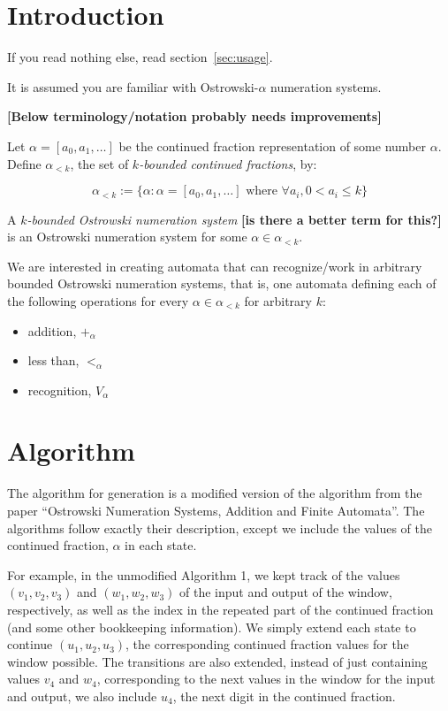 \documentclass{article}
\theoremstyle{definition}
\theoremstyle{remark}
\theoremstyle{remark}
\theoremstyle{plain}
\theoremstyle{definition}
\newcommand{\reed}[1]{{\color{magenta}\bfseries [#1]}}
\begin{document}
\section{Introduction}

If you read nothing else, read section~\ref{sec:usage}.

It is assumed you are familiar with Ostrowski-$\alpha$ numeration systems.

\reed{Below terminology/notation probably needs improvements}

Let $\alpha = [a_0, a_1, \ldots]$ be the continued fraction representation of some number $\alpha$.
Define $\alpha_{<k}$, the set of \textit{$k$-bounded continued fractions}, by:

\begin{equation*}
    \alpha_{<k} := \{ \alpha : \alpha = [ a_0, a_1, \ldots] \text{ where } \forall a_i, 0 < a_i \leq k\}
\end{equation*}

A \textit{$k$-bounded Ostrowski numeration system} \reed{is there a better term for this?} is an Ostrowski numeration system for some $\alpha \in \alpha_{<k}$.

We are interested in creating automata that can recognize/work in arbitrary bounded Ostrowski numeration systems, that is, one automata defining each of the following operations for every $\alpha \in \alpha_{<k}$ for arbitrary $k$:

\begin{itemize}
    \item addition, $+_{\alpha}$
    \item less than, $<_{\alpha}$
    \item recognition, $V_{\alpha}$
\end{itemize}

\section{Algorithm}

The algorithm for generation is a modified version of the algorithm from the paper ``Ostrowski Numeration Systems, Addition and Finite Automata''.
The algorithms follow exactly their description, except we include the values of the continued fraction, $\alpha$ in each state.

For example, in the unmodified Algorithm 1, we kept track of the values $(v_1,v_2,v_3)$ and $(w_1,w_2,w_3)$ of the input and output of the window, respectively, as well as the index in the repeated part of the continued fraction (and some other bookkeeping information).
We simply extend each state to continue $(u_1,u_2,u_3)$, the corresponding continued fraction values for the window possible.
The transitions are also extended, instead of just containing values $v_4$ and $w_4$, corresponding to the next values in the window for the input and output, we also include $u_4$, the next digit in the continued fraction.
\end{document}
